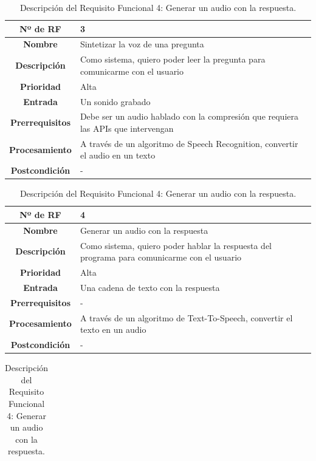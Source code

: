 \begin{table}[H]
	\centering
	\begin{tabularx}{\textwidth}{|c|X|} 
		\hline
		\textbf{Nº de RF }          &  3 \\ 
		\hline
		\textbf{Nombre}         &  Sintetizar la voz de una pregunta \\ 
		\hline
		\textbf{Descripción}    &  Como sistema, quiero poder leer la pregunta para comunicarme con el usuario \\ 
		\hline
		\textbf{Prioridad}      &  Alta  \\ 
		\hline
		\textbf{Entrada}        & Un sonido grabado  \\ 
		\hline
		\textbf{Prerrequisitos} & Debe ser un audio hablado con la compresión que requiera las APIs que intervengan \\ 
		\hline
		\textbf{Procesamiento}  &  A través de un algoritmo de Speech Recognition, convertir el audio en un texto \\ 
		\hline
		\textbf{Postcondición}  &  - \\
		\hline
	\end{tabularx}
	\caption{Descripción del Requisito Funcional 3: Sintetizar la voz de una pregunta.}
	\vspace{0.5cm}
	\centering
	\begin{tabularx}{\textwidth}{|c|X|} 
		\hline
		\textbf{Nº de RF }          &  4 \\ 
		\hline
		\textbf{Nombre}         &  Generar un audio con la respuesta \\ 
		\hline
		\textbf{Descripción}    &  Como sistema, quiero poder hablar la respuesta del programa para comunicarme con el usuario \\ 
		\hline
		\textbf{Prioridad}      &  Alta  \\ 
		\hline
		\textbf{Entrada}        & Una cadena de texto con la respuesta  \\ 
		\hline
		\textbf{Prerrequisitos} & - \\ 
		\hline
		\textbf{Procesamiento}  &  A través de un algoritmo de Text-To-Speech, convertir el texto en un audio \\ 
		\hline
		\textbf{Postcondición}  &  - \\
		\hline
	\end{tabularx}
	\caption{Descripción del Requisito Funcional 4: Generar un audio con la respuesta.}
	\vspace{0.5cm}
	\centering
	\begin{tabularx}{\textwidth}{|c|X|} 

\end{tabularx}
\end{table}

